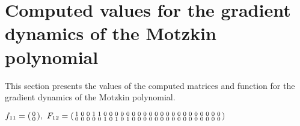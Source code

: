 \documentclass[fleqn]{article}
\begin{document}
\tableofcontents

\section{Computed values for the gradient dynamics of the Motzkin polynomial}
\label{App:Motzkin_values}
This section presents the values of the computed matrices and function for the gradient dynamics of the Motzkin polynomial.

\bigskip

$f_{11} = \spmqty{ 0 \\ 0 },~
F_{12} = \spmqty{ 1 & 0 & 0 & 1 & 1 & 0 & 0 & 0 & 0 & 0 & 0 & 0 & 0 & 0 & 0 & 0 & 0 & 0 & 0 & 0 & 0 & 0 & 0 & 0 & 0 & 0 \\ 0 & 0 & 0 & 0 & 0 & 1 & 0 & 1 & 0 & 1 & 0 & 0 & 0 & 0 & 0 & 0 & 0 & 0 & 0 & 0 & 0 & 0 & 0 & 0 & 0 & 0 }$

\bigskip
\end{document}
